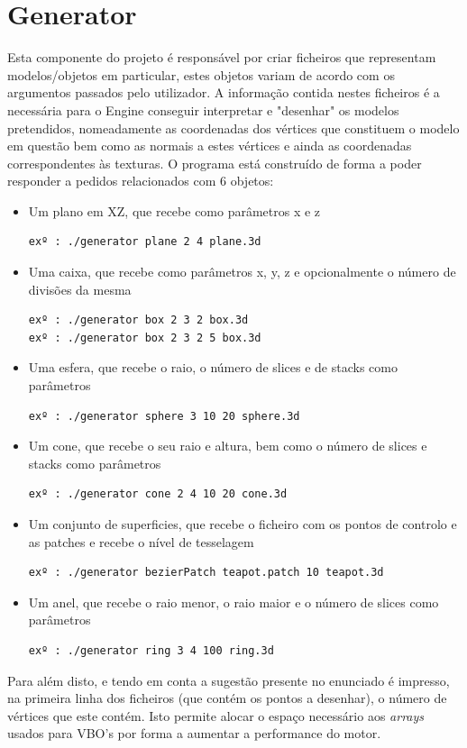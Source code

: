 \documentclass{article}
\begin{document}
\section{Generator}
Esta componente do projeto é responsável por criar ficheiros que representam modelos/objetos em particular, estes objetos variam de acordo com os argumentos passados pelo utilizador. A informação contida nestes ficheiros é a necessária para o Engine conseguir interpretar e "desenhar" os modelos pretendidos, nomeadamente as coordenadas dos vértices que constituem o modelo em questão bem como as normais a estes vértices e ainda as coordenadas correspondentes às texturas. 
O programa está construído de forma a poder responder a pedidos relacionados com 6 objetos:
\begin{itemize}
    \item Um plano em XZ, que recebe como parâmetros x e z
        \begin{verbatim}
exº : ./generator plane 2 4 plane.3d
        \end{verbatim}
    \item Uma caixa, que recebe como parâmetros x, y, z e opcionalmente o número de divisões da mesma
        \begin{verbatim}
exº : ./generator box 2 3 2 box.3d
exº : ./generator box 2 3 2 5 box.3d
        \end{verbatim}
    \item Uma esfera, que recebe o raio, o número de slices e de stacks como parâmetros
        \begin{verbatim}
exº : ./generator sphere 3 10 20 sphere.3d
        \end{verbatim}
    \item Um cone, que recebe o seu raio e altura, bem como o número de slices e stacks como parâmetros
        \begin{verbatim}
exº : ./generator cone 2 4 10 20 cone.3d
        \end{verbatim}
    \item Um conjunto de superficies, que recebe o ficheiro com os pontos de controlo e as patches e recebe o nível de tesselagem
        \begin{verbatim}
exº : ./generator bezierPatch teapot.patch 10 teapot.3d
        \end{verbatim}
    \item Um anel, que recebe o raio menor, o raio maior e o número de slices como parâmetros
        \begin{verbatim}
exº : ./generator ring 3 4 100 ring.3d
        \end{verbatim}
\end{itemize}
Para além disto, e tendo em conta a sugestão presente no enunciado é impresso, na primeira linha dos ficheiros (que contém os pontos a desenhar), o número de vértices que este contém. Isto permite alocar o espaço necessário aos \textit{arrays} usados para VBO's por forma a aumentar a performance do motor.
\end{document}
